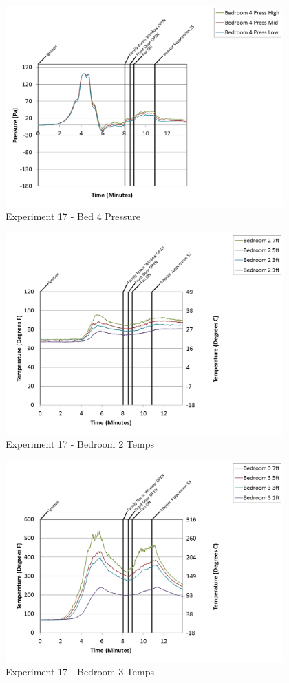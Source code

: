 \documentclass{article}
\begin{document}
\begin{appendices}
\clearpage

\begin{figure}[h!]
	\centering
	\includegraphics[height=3.05in]{0_Images/Results_Charts/Exp_17_Charts/Bed4Pressure.png}
	\caption{Experiment 17 - Bed 4 Pressure}
\end{figure}


\begin{figure}[h!]
	\centering
	\includegraphics[height=3.05in]{0_Images/Results_Charts/Exp_17_Charts/Bedroom2Temps.png}
	\caption{Experiment 17 - Bedroom 2 Temps}
\end{figure}

\clearpage

\begin{figure}[h!]
	\centering
	\includegraphics[height=3.05in]{0_Images/Results_Charts/Exp_17_Charts/Bedroom3Temps.png}
	\caption{Experiment 17 - Bedroom 3 Temps}
\end{figure}



\end{appendices}
\end{document}
